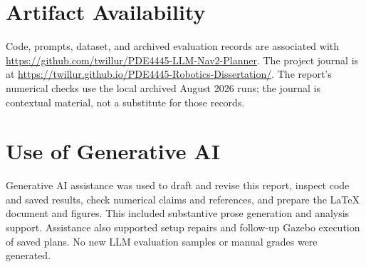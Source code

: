 \documentclass[journal]{IEEEtran}
\begin{document}
\section*{Artifact Availability}
Code, prompts, dataset, and archived evaluation records are associated with \url{https://github.com/twillur/PDE4445-LLM-Nav2-Planner}. The project journal is at \url{https://twillur.github.io/PDE4445-Robotics-Dissertation/}. The report's numerical checks use the local archived August 2026 runs; the journal is contextual material, not a substitute for those records.

\section*{Use of Generative AI}
Generative AI assistance was used to draft and revise this report, inspect code and saved results, check numerical claims and references, and prepare the LaTeX document and figures. This included substantive prose generation and analysis support. Assistance also supported setup repairs and follow-up Gazebo execution of saved plans. No new LLM evaluation samples or manual grades were generated.



\end{document}
